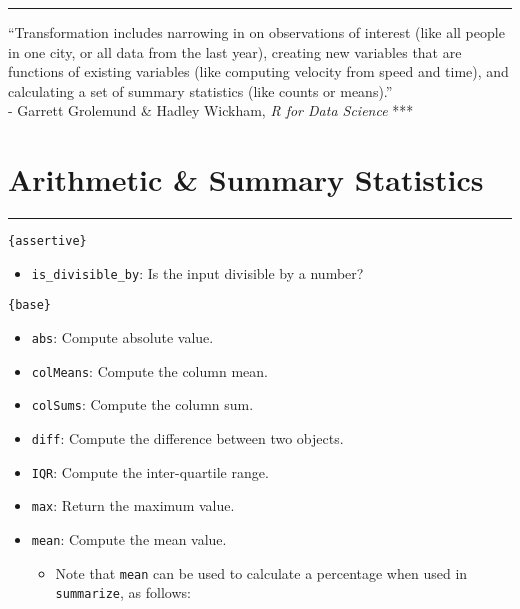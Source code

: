 \documentclass[
]{book}
\providecommand{\tightlist}{%
  \setlength{\itemsep}{0pt}\setlength{\parskip}{0pt}}
\begin{document}
\begin{center}\rule{0.5\linewidth}{0.5pt}\end{center}

``Transformation includes narrowing in on observations of interest (like all people in one city, or all data from the last year), creating new variables that are functions of existing variables (like computing velocity from speed and time), and calculating a set of summary statistics (like counts or means).''\\
- Garrett Grolemund \& Hadley Wickham, \emph{R for Data Science}
***

\hypertarget{arithmetic-summary-statistics}{%
\section{Arithmetic \& Summary Statistics}\label{arithmetic-summary-statistics}}

\begin{center}\rule{0.5\linewidth}{0.5pt}\end{center}

\texttt{\{assertive\}}

\begin{itemize}
\tightlist
\item
  \texttt{is\_divisible\_by}: Is the input divisible by a number?
\end{itemize}

\texttt{\{base\}}

\begin{itemize}
\tightlist
\item
  \texttt{abs}: Compute absolute value.
\item
  \texttt{colMeans}: Compute the column mean.
\item
  \texttt{colSums}: Compute the column sum.
\item
  \texttt{diff}: Compute the difference between two objects.
\item
  \texttt{IQR}: Compute the inter-quartile range.
\item
  \texttt{max}: Return the maximum value.
\item
  \texttt{mean}: Compute the mean value.

  \begin{itemize}
  \tightlist
  \item
    Note that \texttt{mean} can be used to calculate a percentage when used in \texttt{summarize}, as follows:
  \end{itemize}
\end{itemize}
\end{document}
